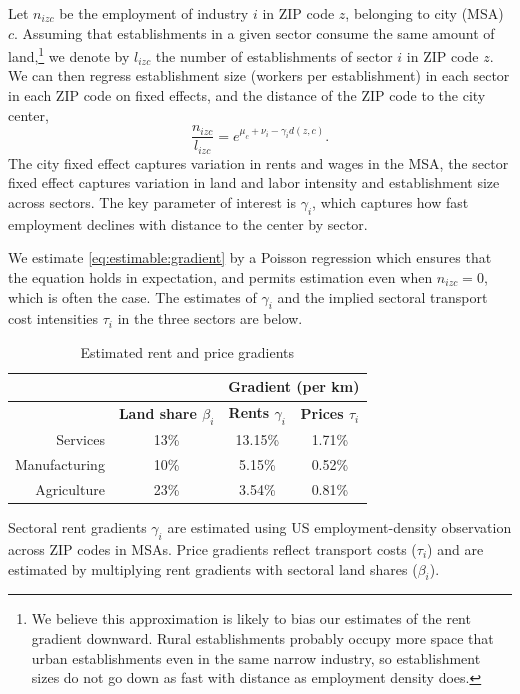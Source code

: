 \documentclass[12pt]{article}
\begin{document}
Let $n_{izc}$ be the employment of industry $i$ in ZIP code $z$, belonging to city (MSA) $c$.  Assuming that establishments in a given sector consume the same amount of land,\footnote{We believe this approximation is likely to bias our estimates of the rent gradient downward. Rural establishments probably occupy more space that urban establishments even in the same narrow industry, so establishment sizes do not go down as fast with distance as employment density does. } we denote by $l_{izc}$ the number of establishments of sector $i$ in ZIP code $z$. We can then regress establishment size (workers per establishment) in each sector in each ZIP code on fixed effects, and the distance of the ZIP code to the city center,
\begin{equation}\label{eq:estimable:gradient}
\frac{n_{izc}}{l_{izc}} = e^{\mu_c+\nu_i-\gamma_i d(z,c)}.
\end{equation}
The city fixed effect captures variation in rents and wages in the MSA, the sector fixed effect captures variation in land and labor intensity and establishment size across sectors. %
The key parameter of interest is $\gamma_i$, which captures how fast employment declines with distance to the center by sector.

We estimate \eqref{eq:estimable:gradient} by a Poisson regression which ensures that the equation holds in expectation, and permits estimation even when $n_{izc}=0$, which is often the case. The estimates of $\gamma_i$ and the implied sectoral transport cost intensities $\tau_i$ in the three sectors are below.

\begin{table}[h!]
  \begin{center}
  \caption{Estimated rent and price gradients}
    \begin{tabular}{rccc}
    \toprule
    \textbf{} & \textbf{} & \multicolumn{2}{c}{\textbf{Gradient (per km)}}\\
    \midrule
    \textbf{} & \textbf{Land share $\beta_i$ } & \textbf{Rents $\gamma_i$} & \textbf{Prices $\tau_i$} \\
    Services & 13\%  & 13.15\% & 1.71\% \\
    Manufacturing & 10\%  & 5.15\% & 0.52\% \\
    Agriculture & 23\%  & 3.54\% & 0.81\% \\
    \bottomrule
    \end{tabular}%

  \end{center}
  \label{tab:EmpGrad}%

  \noindent \footnotesize{Sectoral rent gradients $\gamma_i$ are estimated using US employment-density observation across ZIP codes in MSAs. Price gradients reflect transport costs ($\tau_i$) and are estimated by multiplying rent gradients with sectoral land shares ($\beta_i$). }
\end{table}%
\end{document}

